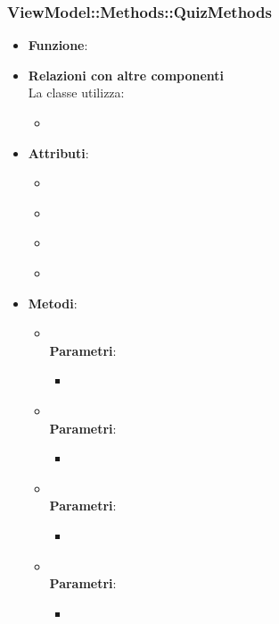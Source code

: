\subsubsection{ViewModel::Methods::QuizMethods}
\begin{itemize}
\item\textbf{Funzione}:
\item\textbf{Relazioni con altre componenti}\\
La classe utilizza:
	\begin{itemize}
		\item
	\end{itemize}
\item\textbf{Attributi}:
	\begin{itemize}
		\item\code{}\\
		\item\code{}\\
		\item\code{}\\
		\item\code{}\\
	\end{itemize}
\item\textbf{Metodi}:
	\begin{itemize}
		\item\code{}\\
		\textbf{Parametri}:
			\begin{itemize}
				\item\code{}\\
			\end{itemize}
		\item\code{}\\
		\textbf{Parametri}:
			\begin{itemize}
				\item\code{}\\
			\end{itemize}
		\item\code{}\\
		\textbf{Parametri}:
			\begin{itemize}
				\item\code{}\\
			\end{itemize}
		\item\code{}\\
		\textbf{Parametri}:
			\begin{itemize}
				\item\code{}\\
			\end{itemize}
	\end{itemize}
\end{itemize}

